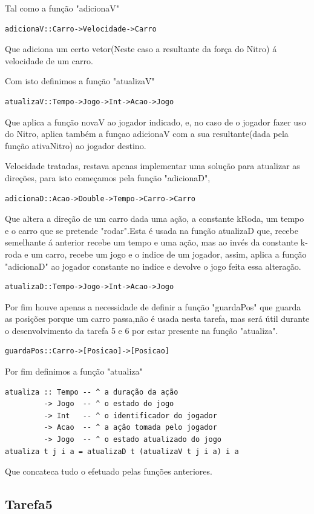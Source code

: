 \documentclass[a4paper]{report} %
\begin{document}
Tal como a função "adicionaV"
\begin{verbatim}
adicionaV::Carro->Velocidade->Carro
\end{verbatim}
Que adiciona um certo vetor(Neste caso a resultante da força do Nitro) á velocidade de um carro.

Com isto definimos a função "atualizaV"
\begin{verbatim}
atualizaV::Tempo->Jogo->Int->Acao->Jogo
\end{verbatim}
Que aplica a função novaV ao jogador indicado, e, no caso de o jogador fazer uso do Nitro, aplica também a funçao adicionaV com a sua resultante(dada pela função ativaNitro) ao jogador destino.

Velocidade tratadas, restava apenas implementar uma solução para atualizar as direções, para isto começamos pela função "adicionaD",
\begin{verbatim}
adicionaD::Acao->Double->Tempo->Carro->Carro
\end{verbatim}
Que altera a direção de um carro dada uma ação, a constante kRoda, um tempo e o carro que se pretende "rodar".Esta é usada na função atualizaD que, recebe semelhante á anterior recebe um tempo e uma ação, mas ao invés da constante k-roda e um carro, recebe um jogo e o indice de um jogador, assim, aplica a função "adicionaD" ao jogador constante no indice e devolve o jogo feita essa alteração.
\begin{verbatim}
atualizaD::Tempo->Jogo->Int->Acao->Jogo
\end{verbatim}
Por fim houve apenas a necessidade de definir a função "guardaPos" que guarda as posições porque um carro passa,não é usada nesta tarefa, mas será útil durante o desenvolvimento da tarefa 5 e 6 por estar presente na função "atualiza".
\begin{verbatim}
guardaPos::Carro->[Posicao]->[Posicao]
\end{verbatim}

Por fim definimos a função "atualiza"
\begin{verbatim}
atualiza :: Tempo -- ^ a duração da ação
         -> Jogo  -- ^ o estado do jogo
         -> Int   -- ^ o identificador do jogador
         -> Acao  -- ^ a ação tomada pelo jogador
         -> Jogo  -- ^ o estado atualizado do jogo
atualiza t j i a = atualizaD t (atualizaV t j i a) i a
\end{verbatim}
Que concateca tudo o efetuado pelas funções anteriores.
\subsection{Tarefa5}
\end{document}
